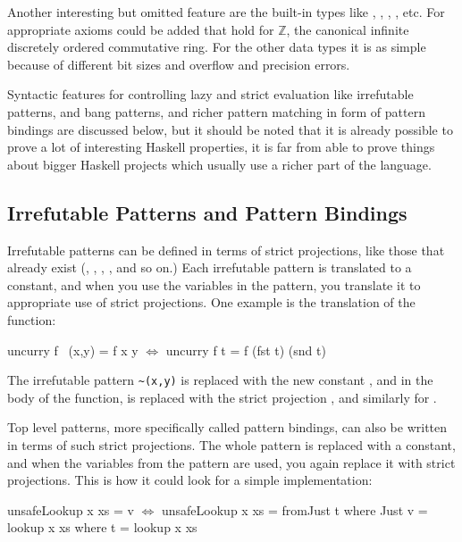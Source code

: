 Another interesting but omitted feature are the built-in types like
, , , , etc. For 
appropriate axioms could be added that hold for $\mathbb{Z}$, the
canonical infinite discretely ordered commutative ring. For the other
data types it is as simple because of different bit sizes and overflow
and precision errors.

Syntactic features for controlling lazy and strict evaluation like
irrefutable patterns,  and bang patterns, and richer pattern
matching in form of pattern bindings are discussed below, but it
should be noted that it is already possible to prove a lot of
interesting Haskell properties, it is far from able to prove things
about bigger Haskell projects which usually use a richer part of the
language.

\subsection{Irrefutable Patterns and Pattern Bindings}

Irrefutable patterns can be defined in terms of strict projections,
like those that already exist (, , ,
, and so on.) Each irrefutable pattern is translated to a
constant, and when you use the variables in the pattern, you translate
it to appropriate use of strict projections. One example is the
translation of the  function:

\begin{code}[mathescape]
uncurry f ~(x,y) = f x y        $\Leftrightarrow$      uncurry f t = f (fst t) (snd t)
\end{code}

\noindent
The irrefutable pattern \verb:~(x,y): is replaced with the new constant
, and in the body of the function,  is replaced with the
strict projection , and similarly for .

Top level patterns, more specifically called pattern bindings, can
also be written in terms of such strict projections. The whole pattern
is replaced with a constant, and when the variables from the pattern
are used, you again replace it with strict projections. This is how it
could look for a simple  implementation:

\begin{code}[mathescape]
unsafeLookup x xs = v           $\Leftrightarrow$      unsafeLookup x xs = fromJust t
  where Just v = lookup x xs            where t = lookup x xs
\end{code}

